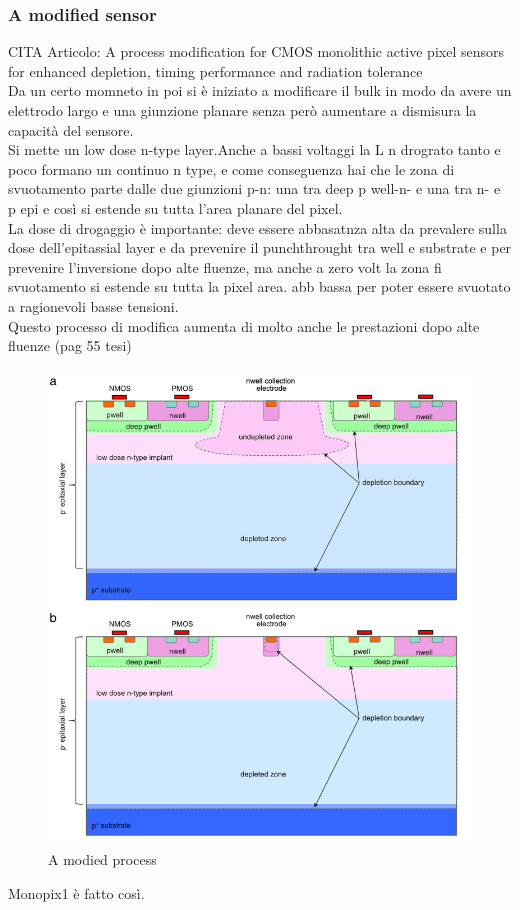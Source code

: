 \begin{titlepage}
\subsubsection{A modified sensor}
CITA Articolo: A process modification for CMOS monolithic active pixel sensors for
enhanced depletion, timing performance and radiation tolerance\\
Da un certo momneto in poi si è iniziato a modificare il bulk in modo da avere un elettrodo largo e
una giunzione planare senza però aumentare a dismisura la capacità del sensore.\\
Si mette un low dose n-type layer.Anche a bassi voltaggi la
L n drograto tanto e poco formano un continuo n type, e come conseguenza hai che le
zona di svuotamento parte dalle due giunzioni p-n: una tra deep p well-n- e una tra
n- e p epi e così si estende su tutta l'area planare del pixel. \\
La dose di drogaggio è importante: deve essere abbasatnza alta da prevalere sulla dose
dell'epitassial layer e da prevenire il punchthrought tra well e substrate e per
prevenire l'inversione dopo alte fluenze, ma anche a zero volt la zona fi svuotamento si estende su 
tutta la pixel area. 
abb bassa per poter essere svuotato a ragionevoli basse tensioni.\\
Questo processo di modifica aumenta di molto anche le prestazioni dopo alte fluenze (pag 55 tesi)
\begin{figure}
   \centering\includegraphics[width=12cm]{figures/modified_process.png}
   \caption{A modied process}
   \label{fig:modified_process}
   \end{figure}
Monopix1 è fatto così.


\end{titlepage}
